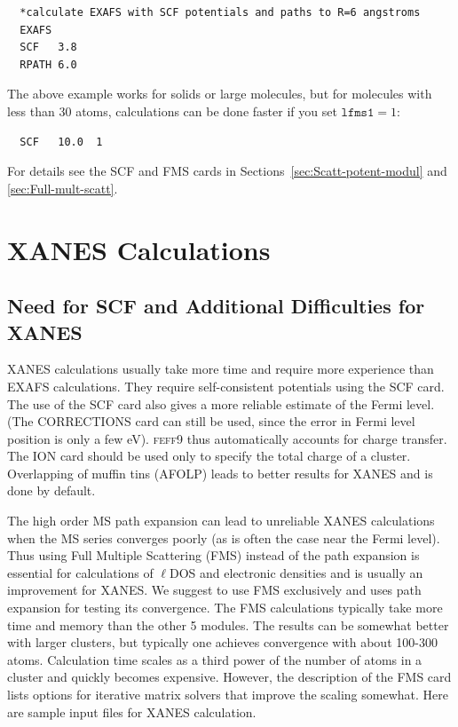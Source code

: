 \documentclass[11pt,oneside]{report} %
\renewcommand{\htmlref}[2]{\hyperlink{#2}{#1}}
\newcommand{\program}[1]{\textsc{#1}}
\newcommand{\feff}{\program{feff}}
\newcommand{\vnum}{9}
\newcommand{\feffcur}{\feff\vnum}
\renewcommand{\htmlref}[2]{{#1}} %
\begin{document}
\begin{verbatim}
  *calculate EXAFS with SCF potentials and paths to R=6 angstroms
  EXAFS
  SCF   3.8
  RPATH 6.0
\end{verbatim}

The above example works for solids or large molecules, but for molecules with 
less than 30 atoms, calculations can be done faster if you set $\mathtt{lfms1}=1$:
\begin{verbatim}
  SCF   10.0  1
\end{verbatim}

For details see the \htmlref{SCF}{card:scf} and \htmlref{FMS}{card:fms} cards in
Sections~\ref{sec:Scatt-potent-modul} and \ref{sec:Full-mult-scatt}.


\section{XANES Calculations}
\label{sec:XANES-calculations}

\subsection{Need for SCF and Additional Difficulties for XANES}
\label{sec:Addit-diff}
XANES calculations usually take more time and require more experience than EXAFS calculations.
They require self-consistent potentials using the \htmlref{SCF}{card:scf} card. The use of the SCF card 
also gives a more reliable estimate of the Fermi level.  (The CORRECTIONS card
can still be used, since the error in Fermi level position is only a few eV).
{\feffcur} thus automatically accounts for charge transfer. The ION card should 
be used only to specify the total charge of a cluster. Overlapping of muffin tins (AFOLP) leads to better results for XANES and is done by default.

The high order MS path expansion can lead to unreliable XANES calculations when the MS series converges
poorly (as is often the case near the Fermi level). Thus using Full Multiple Scattering (FMS) instead of the path expansion is essential for calculations of $\ell$DOS and
electronic densities and is usually an improvement for XANES. We suggest to use FMS exclusively and uses path expansion for testing its convergence.  The FMS calculations
typically take more time and memory than the other 5 modules. The
results can be somewhat better with larger clusters, but typically
one achieves convergence with about 100-300 atoms.  Calculation
time scales as a third power of the number of atoms in a cluster and
quickly becomes expensive.  However, the description of the FMS card lists options for iterative matrix solvers that improve
the scaling somewhat.
Here are sample input files for XANES calculation.
\end{document}

